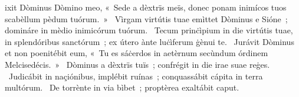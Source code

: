 \psalmChapterWithInscription{}
{ }
{%
ixit Dòminus Dòmino meo, «~Sede a dèxtrïs meïs, donec ponam inimícos tuos scabèllum pèdum tuórum.~»
~Vìrgam virtútis tuae emìttet Dòminus e Sióne~; domináre in mèdio inimicórum tuórum. 
~Tecum prinċìpium in die virtútis tuae, in splendóribus sanctórum~; ex útero ànte luċìferum ġènui te. 
~Jurávit Dòminus et non poenitébit eum, «~Tu es sáċerdos in aetèrnum secùndum órdinem Melcisedécis.~»
~Dòminus a dèxtrïs tuïs~; confrégit in die irae suae reġes. 
~Judicábit in naçiónibus, implébit ruínas~; conquassábit cápita in terra multórum. 
~De torrènte in via bìbet~; proptèrea exaltábit caput. 
}
